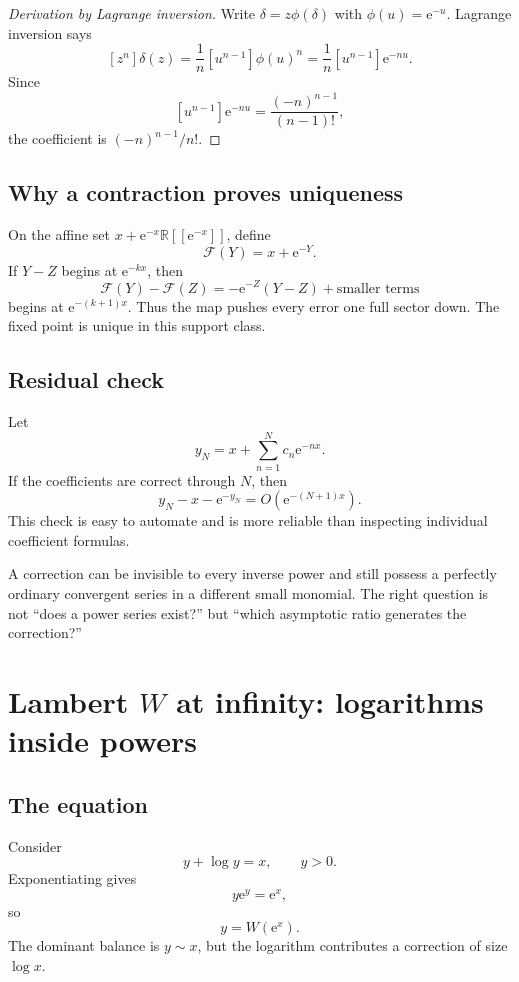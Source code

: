 \documentclass[11pt,oneside]{book}
\theoremstyle{definition}
\theoremstyle{remark}
\newcommand{\R}{\mathbb{R}}
\newcommand{\e}{\mathrm{e}}
\newcommand{\bigO}{O}
\begin{document}
\begin{proof}[Derivation by Lagrange inversion]
Write $\delta=z\phi(\delta)$ with $\phi(u)=\e^{-u}$. Lagrange inversion says
\[
  [z^n]\delta(z)=\frac1n[u^{n-1}]\phi(u)^n
  =\frac1n[u^{n-1}]\e^{-nu}.
\]
Since
\[
  [u^{n-1}]\e^{-nu}=\frac{(-n)^{n-1}}{(n-1)!},
\]
the coefficient is $(-n)^{n-1}/n!$.
\end{proof}

\section{Why a contraction proves uniqueness}

On the affine set $x+\e^{-x}\R[[\e^{-x}]]$, define
\[
  \mathcal F(Y)=x+\e^{-Y}.
\]
If $Y-Z$ begins at $\e^{-kx}$, then
\[
  \mathcal F(Y)-\mathcal F(Z)
  =-\e^{-Z}(Y-Z)+\text{smaller terms}
\]
begins at $\e^{-(k+1)x}$. Thus the map pushes every error one full sector down.
The fixed point is unique in this support class.

\section{Residual check}

Let
\[
  y_N=x+\sum_{n=1}^{N}c_n\e^{-nx}.
\]
If the coefficients are correct through $N$, then
\[
  y_N-x-\e^{-y_N}=\bigO(\e^{-(N+1)x}).
\]
This check is easy to automate and is more reliable than inspecting individual
coefficient formulas.

\begin{bigidea}
A correction can be invisible to every inverse power and still possess a
perfectly ordinary convergent series in a different small monomial. The right
question is not ``does a power series exist?'' but ``which asymptotic ratio
generates the correction?''
\end{bigidea}

\chapter{Lambert \texorpdfstring{$W$}{W} at infinity: logarithms inside powers}
\label{ch:lambert-large}

\section{The equation}

Consider
\begin{equation}
  y+\log y=x,
  \qquad y>0.
  \label{eq:lambert-large-equation}
\end{equation}
Exponentiating gives
\[
  y\e^y=\e^x,
\]
so
\[
  y=W(\e^x).
\]
The dominant balance is $y\sim x$, but the logarithm contributes a correction of
size $\log x$.
\end{document}
